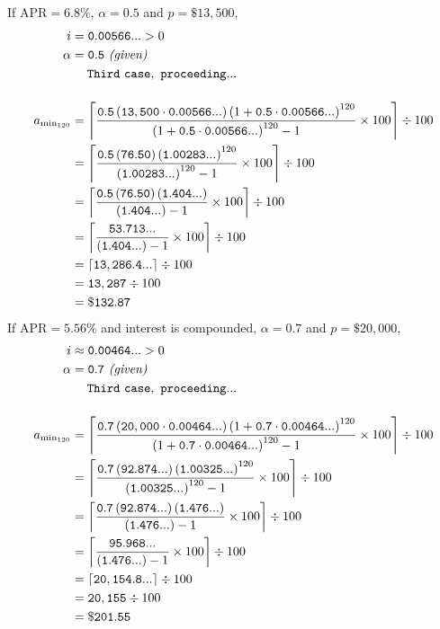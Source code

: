 \documentclass[12pt,letterpaper,oneside]{article}
\theoremstyle{remark} %
\begin{document}
	\newpage
	\newcommand{\base}{\left(1+\mathtt{0.5}\cdot\mathtt{0.00566...}\right)}
	If $\mbox{APR}=6.8\%$, $\alpha=0.5$ and $p=\$13,500$,
	\begin{align*}
	i&=\mathtt{0.00566...}>0\\
	\alpha&=\mathtt{0.5}\ \textit{(given)}\\
	&\quad\;\mathtt{Third\ case,\ proceeding...}\\[12pt]
	a_{\rm{min_{120}}}&=\left\lceil{\frac{\mathtt{0.5}\left(\mathtt{13,500}\cdot\mathtt{0.00566...}\right)\base^{120}}{\base^{120}-1}\times 100}\right\rceil\div 100\\
	&=\left\lceil{\frac{\mathtt{0.5}\left(\mathtt{76.50}\right)\left(\mathtt{1.00283...}\right)^{120}}{\left(\mathtt{1.00283...}\right)^{120}-1}\times 100}\right\rceil\div 100\\
	&=\left\lceil{\frac{\mathtt{0.5}\left(\mathtt{76.50}\right)\left(\mathtt{1.404...}\right)}{\left(\mathtt{1.404...}\right)-1}\times 100}\right\rceil\div 100\\
	&=\left\lceil{\frac{\mathtt{53.713...}}{\left(\mathtt{1.404...}\right)-1}\times 100}\right\rceil\div 100\\
	&=\left\lceil{\mathtt{13,286.4...}}\right\rceil\div 100\\
	&=\mathtt{13,287}\div 100\\
	&=\mathtt{\$132.87}
	\end{align*}
	\renewcommand{\base}{\left(1+\mathtt{0.7}\cdot\mathtt{0.00464...}\right)}
	If $\mbox{APR}=5.56\%$ and interest is compounded, $\alpha=0.7$ and $p=\$20,000$,
	\begin{align*}
	i&\approx\mathtt{0.00464...}>0\\
	\alpha&=\mathtt{0.7}\ \textit{(given)}\\
	&\quad\;\mathtt{Third\ case,\ proceeding...}\\[12pt]
	a_{\rm{min_{120}}}&=\left\lceil{\frac{\mathtt{0.7}\left(\mathtt{20,000}\cdot\mathtt{0.00464...}\right)\base^{120}}{\base^{120}-1}\times 100}\right\rceil\div 100\\
	&=\left\lceil{\frac{\mathtt{0.7}\left(\mathtt{92.874...}\right)\left(\mathtt{1.00325...}\right)^{120}}{\left(\mathtt{1.00325...}\right)^{120}-1}\times 100}\right\rceil\div 100\\
	&=\left\lceil{\frac{\mathtt{0.7}\left(\mathtt{92.874...}\right)\left(\mathtt{1.476...}\right)}{\left(\mathtt{1.476...}\right)-1}\times 100}\right\rceil\div 100\\
	&=\left\lceil{\frac{\mathtt{95.968...}}{\left(\mathtt{1.476...}\right)-1}\times 100}\right\rceil\div 100\\
	&=\left\lceil{\mathtt{20,154.8...}}\right\rceil\div 100\\
	&=\mathtt{20,155}\div 100\\
	&=\mathtt{\$201.55}
	\end{align*}
\end{document}
